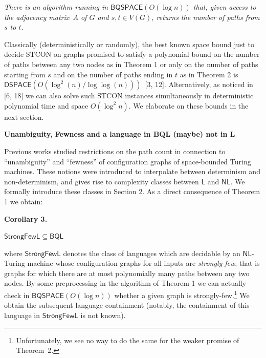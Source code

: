 \emph{There is an algorithm running in $\mathsf{BQSPACE}(O(\log n))$ that, given access to the adjacency matrix $A$ of $G$ and $s,t\in V(G)$, returns the number of paths from $s$ to $t$.}\par






Classically (deterministically or randomly), the best known space bound just to decide $\mathrm{STCON}$ on graphs promised to satisfy a polynomial bound on the number of paths between any two nodes as in Theorem 1 or only on the number of paths starting from $s$ and on the number of paths ending in $t$ as in Theorem 2 is $\mathsf{DSPACE}(O(\log^{2}(n)/\log\log(n)))$ [3, 12].
Alternatively, as noticed in [6, 18] we can also solve such $\mathrm{STCON}$ instances simultaneously in deterministic polynomial time and space $O(\log^{2}n)$.
We elaborate on these bounds in the next section.\par






\par\medskip\noindent\textbf{Unambiguity, Fewness and a language in BQL (maybe) not in L}\par




Previous works studied restrictions on the path count in connection to “unambiguity” and “fewness” of configuration graphs of space-bounded Turing machines.
These notions were introduced to interpolate between determinism and non-determinism, and gives rise to complexity classes between $\mathsf{L}$ and $\mathsf{NL}$. We formally introduce these classes in Section 2.
As a direct consequence of Theorem 1 we obtain:\par





\par\medskip\noindent\textbf{
\textbf{Corollary 3}\textbf{.}
}\par



$\mathsf{StrongFewL}\subseteq\mathsf{BQL}$\emph{}\par






where $\mathsf{StrongFewL}$ denotes the class of languages which are decidable by an $\mathsf{NL}$-Turing machine whose configuration graphs for all inputs are \emph{strongly-few}, that is graphs for which there are at most polynomially many paths between any two nodes.
By some preprocessing in the algorithm of Theorem 1 we can actually check in $\mathsf{BQSPACE}(O(\log n))$ whether a given graph is strongly-few.\footnote{Unfortunately, we see no way to do the same for the weaker promise of Theorem 2.}
We obtain the subsequent language containment (notably, the containment of this language in $\mathsf{StrongFewL}$ is not known).\par



